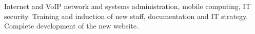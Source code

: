 {Internet and VoIP network and systems administration, mobile computing, IT security. Training and induction of new staff, documentation and IT strategy. Complete development of the new website.}
